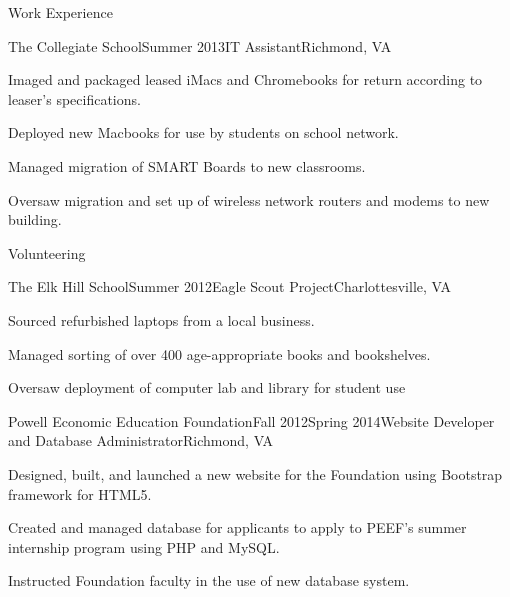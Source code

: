 \documentclass{resume} %
\begin{document}
\begin{rSection}{Work Experience}

\begin{rSubsection}{The Collegiate School}{Summer 2013}{IT Assistant}{Richmond, VA}
\item Imaged and packaged leased iMacs and Chromebooks for return according to leaser's specifications.
\item Deployed new Macbooks for use by students on school network.
\item Managed migration of SMART Boards to new classrooms.
\item Oversaw migration and set up of wireless network routers and modems to new
building.
\end{rSubsection}
\end{rSection}


\begin{rSection}{Volunteering}

\begin{rSubsection}{The Elk Hill School}{Summer 2012}{Eagle Scout Project}{Charlottesville, VA}
\item Sourced refurbished laptops from a local business.
\item Managed sorting of over 400 age-appropriate books and bookshelves.
\item Oversaw deployment of computer lab and library for student use
\end{rSubsection}

\begin{rSubsection}{Powell Economic Education Foundation}{Fall 2012\textminus Spring 2014}{Website Developer and Database Administrator}{Richmond, VA}
\item Designed, built, and launched a new website for the Foundation using Bootstrap framework for HTML5.
\item Created and managed database for applicants to apply to PEEF's summer internship program using PHP and MySQL.
\item Instructed Foundation faculty in the use of new database system.
\end{rSubsection}

\end{rSection}







\end{document}
